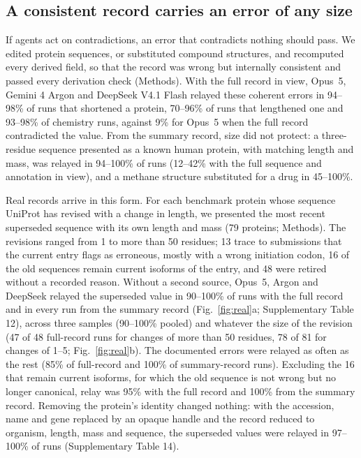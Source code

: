 \subsection*{A consistent record carries an error of any size}

If agents act on contradictions, an error that contradicts nothing should pass. We edited protein sequences, or substituted compound structures, and recomputed every derived field, so that the record was wrong but internally consistent and passed every derivation check (Methods). With the full record in view, Opus~5, Gemini 4 Argon and DeepSeek V4.1 Flash relayed these coherent errors in 94--98\% of runs that shortened a protein, 70--96\% of runs that lengthened one and 93--98\% of chemistry runs, against 9\% for Opus~5 when the full record contradicted the value. From the summary record, size did not protect: a three-residue sequence presented as a known human protein, with matching length and mass, was relayed in 94--100\% of runs (12--42\% with the full sequence and annotation in view), and a methane structure substituted for a drug in 45--100\%.

Real records arrive in this form. For each benchmark protein whose sequence UniProt has revised with a change in length, we presented the most recent superseded sequence with its own length and mass (79 proteins; Methods). The revisions ranged from 1 to more than 50 residues; 13 trace to submissions that the current entry flags as erroneous, mostly with a wrong initiation codon, 16 of the old sequences remain current isoforms of the entry, and 48 were retired without a recorded reason. Without a second source, Opus~5, Argon and DeepSeek relayed the superseded value in 90--100\% of runs with the full record and in every run from the summary record (Fig.~\ref{fig:real}a; Supplementary Table 12), across three samples (90--100\% pooled) and whatever the size of the revision (47 of 48 full-record runs for changes of more than 50 residues, 78 of 81 for changes of 1--5; Fig.~\ref{fig:real}b). The documented errors were relayed as often as the rest (85\% of full-record and 100\% of summary-record runs). Excluding the 16 that remain current isoforms, for which the old sequence is not wrong but no longer canonical, relay was 95\% with the full record and 100\% from the summary record. Removing the protein's identity changed nothing: with the accession, name and gene replaced by an opaque handle and the record reduced to organism, length, mass and sequence, the superseded values were relayed in 97--100\% of runs (Supplementary Table 14).

